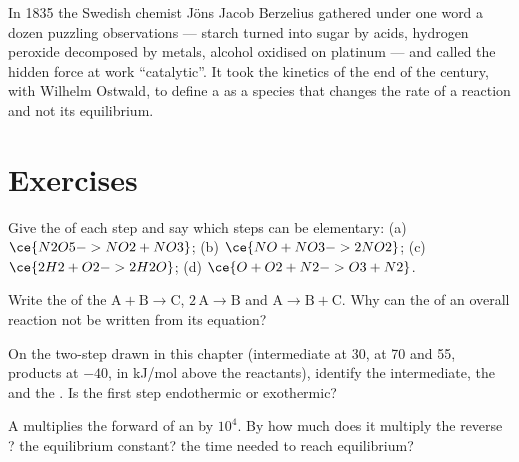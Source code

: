 \begin{history}[Catalysis, 1835]
In 1835 the Swedish chemist Jöns Jacob Berzelius gathered under one word
a dozen puzzling observations --- starch turned into sugar by acids,
hydrogen peroxide decomposed by metals, alcohol oxidised on platinum ---
and called the hidden force at work ``catalytic''. It took the kinetics of
the end of the century, with Wilhelm Ostwald, to define a  as a
species that changes the rate of a reaction and not its equilibrium.
\end{history}

\section{Exercises}

\begin{exercise}[$\star$]\label{exo:b1:elementary-steps:1}
Give the  of each step and say which steps can be elementary:
(a) $\ce{N2O5 -> NO2 + NO3}$; (b) $\ce{NO + NO3 -> 2NO2}$;
(c) $\ce{2H2 + O2 -> 2H2O}$; (d) $\ce{O + O2 + N2 -> O3 + N2}$.
\end{exercise}

\begin{exercise}[$\star$]\label{exo:b1:elementary-steps:2}
Write the  of the  $\mathrm{A} + \mathrm{B} \to
\mathrm{C}$, $2\,\mathrm{A} \to \mathrm{B}$ and $\mathrm{A} \to \mathrm{B} +
\mathrm{C}$. Why can the  of an overall reaction not be written from
its equation?
\end{exercise}

\begin{exercise}[$\star$]\label{exo:b1:elementary-steps:3}
On the two-step  drawn in this chapter (intermediate at
30,  at 70 and 55, products at $-40$, in
\unit{kJ/mol} above the reactants), identify the intermediate, the
 and the . Is the first step endothermic or exothermic?
\end{exercise}

\begin{exercise}[$\star$]\label{exo:b1:elementary-steps:4}
A  multiplies the forward  of an  by
$10^4$. By how much does it multiply the reverse ? the
equilibrium constant? the time needed to reach equilibrium?
\end{exercise}

